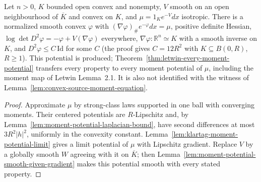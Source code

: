 \begin{lemma}
  \label{lem:convex-source-smooth-moment-potential}
  \leanok
  Let $n>0$, $K$ bounded open convex and nonempty, $V$ smooth on an open neighbourhood of
  $\overline K$ and convex on $K$, and $\mu=1_Ke^{-V}dx$ isotropic. There is a normalized smooth convex
  $\varphi$ with $(\nabla\varphi)_\#e^{-\varphi}dx=\mu$, positive definite Hessian,
  $\log\det D^2\varphi=-\varphi+V(\nabla\varphi)$ everywhere, $\nabla\varphi:\mathbb R^n\simeq K$ with a
  smooth inverse on $K$, and $D^2\varphi\le C\,\mathrm{Id}$ for some $C$ (the proof gives $C=12R^2$ with
  $K\subseteq B(0,R)$, $R\ge1$). This potential is produced; Theorem~\ref{thm:letwin-every-moment-potential}
  transfers every property to every moment potential of $\mu$, including the moment map of Letwin Lemma~2.1. It is
  also not identified with the witness of Lemma~\ref{lem:convex-source-moment-equation}.
\end{lemma}
\begin{proof}
  \leanok
  Approximate $\mu$ by strong-class laws supported in one ball with converging moments. Their
  centered potentials are $R$-Lipschitz and, by Lemma~\ref{lem:moment-potential-laplacian-bound},
  have second differences at most $3R^2|h|^2$, uniformly in the convexity constant.
  Lemma~\ref{lem:klartag-moment-potential-limit} gives a limit potential of $\mu$ with Lipschitz
  gradient. Replace $V$ by a globally smooth $W$ agreeing with it on $\overline K$; then
  Lemma~\ref{lem:moment-potential-smooth-given-gradient} makes this potential smooth with every
  stated property.
\end{proof}

